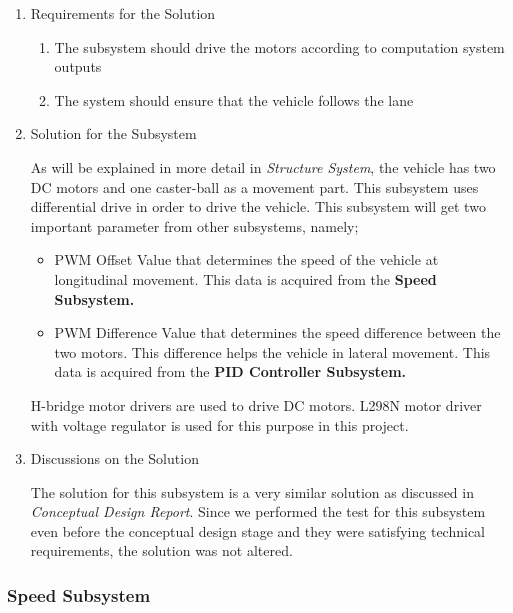 \documentclass[a4paper,12pt]{article}
\begin{document}
		\begin{enumerate}
			\item {Requirements for the Solution}
			
			\begin{enumerate}
					\item The subsystem should drive the motors according to computation system outputs
					\item The system should ensure that the vehicle follows the lane 	
				\end{enumerate}
				
			\item {Solution for the Subsystem}
			
	As will be explained in more detail in \textit{Structure System}, the vehicle has two DC motors and one caster-ball as a movement part. This subsystem uses differential drive in order to drive the vehicle. This subsystem will get two important parameter from other subsystems, namely;
	
	\begin{itemize}
		\item PWM Offset Value that determines the speed of the vehicle at longitudinal movement. This data is acquired from the \textbf{Speed Subsystem.} 	
		\item PWM Difference Value that determines the speed difference between the two motors. This difference helps the vehicle in lateral movement. This data is acquired from the \textbf{PID Controller Subsystem.} 	
	\end{itemize}	
	
	  H-bridge motor drivers are used to drive DC motors. L298N motor driver with voltage regulator is used for this purpose in this project. 
			
			\item {Discussions on the Solution}
			
			The solution for this subsystem is a very similar solution as discussed in \textit{Conceptual Design Report}. Since we performed the test for this subsystem even before the conceptual design stage and they were satisfying technical requirements, the solution was not altered. 
			
			
		\end{enumerate}
			
	
			
		\subsubsection{Speed Subsystem}
		
\end{document}

